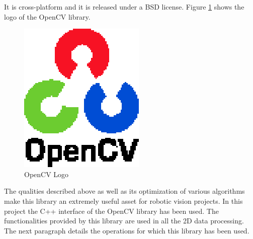 	It is cross-platform and it is released under a BSD\cite{BSD} license. 
	Figure \ref{opencv_logo} shows the logo of the OpenCV library. 

	\begin{figure}[h]
		\begin{center}
	    \includegraphics[scale=1]{img/opencv/logo.eps}
		\caption[OpenCV Logo]{OpenCV Logo}
		\label{opencv_logo}
		\end{center}
	\end{figure}

	The qualities described above as well as its optimization of various algorithms make this library an extremely useful asset for robotic vision projects. 
	In this project the C++ interface of the OpenCV library has been used. 
	The functionalities provided by this library are used in all the 2D data processing. 
	The next paragraph details the operations for which this library has been used. 

